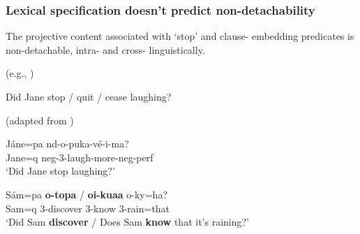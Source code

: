 \documentclass[pdf,xcolor=table,envcountsect,handout]{beamer}
\begin{document}
\begin{frame}
\frametitle{Lexical specification doesn't predict non-detachability}

The projective content associated with `stop' and clause- embedding predicates is non-detachable, intra- and cross- linguistically. \begin{tiny}(e.g., \citealt{levinson-annamalai92,simons01,brst-lang11,tonhauser-guarani-variability}) \end{tiny}

\pause

\begin{exe}

 Did Jane stop / quit / cease laughing? \\[-.2cm] \hfill \begin{tiny} (adapted from \citealt[435]{simons01}) \end{tiny}

\medskip
\pause

 \gll J\'ane=pa nd-o-puka-v\'e-i-ma? \\ Jane{\sc =q} {\sc neg-}3-laugh-more{\sc -neg-perf} \\ \glt `Did Jane stop laughing?'

\medskip
\pause

 \gll S\'am=pa {\bf o-topa} / {\bf oi-kuaa} o-ky=ha? \\ Sam{\sc =q} 3-discover {} 3-know 3-rain=that \\ \glt `Did Sam {\bf discover} / Does Sam {\bf know} that it's raining?'

\end{exe}

\end{frame}
\end{document}
